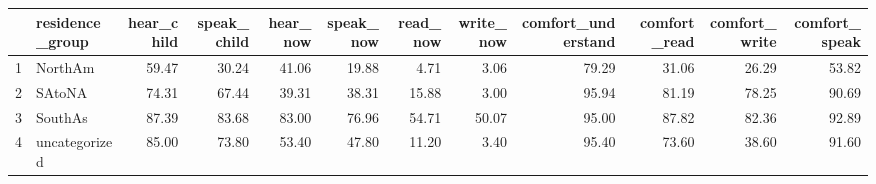 \begin{table}[ht]
\centering
\begin{tabular}{rlrrrrrrrrrr}
  \hline
 & residence\_group & hear\_child & speak\_child & hear\_now & speak\_now & read\_now & write\_now & comfort\_understand & comfort\_read & comfort\_write & comfort\_speak \\ 
  \hline
1 & NorthAm & 59.47 & 30.24 & 41.06 & 19.88 & 4.71 & 3.06 & 79.29 & 31.06 & 26.29 & 53.82 \\ 
  2 & SAtoNA & 74.31 & 67.44 & 39.31 & 38.31 & 15.88 & 3.00 & 95.94 & 81.19 & 78.25 & 90.69 \\ 
  3 & SouthAs & 87.39 & 83.68 & 83.00 & 76.96 & 54.71 & 50.07 & 95.00 & 87.82 & 82.36 & 92.89 \\ 
  4 & uncategorized & 85.00 & 73.80 & 53.40 & 47.80 & 11.20 & 3.40 & 95.40 & 73.60 & 38.60 & 91.60 \\ 
   \hline
\end{tabular}
\end{table}
